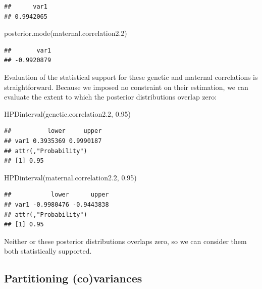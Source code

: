 \documentclass[
  12pt,
]{book}
\newenvironment{Shaded}{\begin{snugshade}}{\end{snugshade}}
\newcommand{\FloatTok}[1]{\textcolor[rgb]{0.00,0.00,0.81}{#1}}
\newcommand{\FunctionTok}[1]{\textcolor[rgb]{0.00,0.00,0.00}{#1}}
\newcommand{\NormalTok}[1]{#1}
\begin{document}
\begin{verbatim}
##      var1 
## 0.9942065
\end{verbatim}

\begin{Shaded}
\begin{Highlighting}[]
\FunctionTok{posterior.mode}\NormalTok{(maternal.correlation2}\FloatTok{.2}\NormalTok{)}
\end{Highlighting}
\end{Shaded}

\begin{verbatim}
##       var1 
## -0.9920879
\end{verbatim}

Evaluation of the statistical support for these genetic and maternal correlations is straightforward. Because we imposed no constraint on their estimation, we can evaluate the extent to which the posterior distributions overlap zero:

\begin{Shaded}
\begin{Highlighting}[]
\FunctionTok{HPDinterval}\NormalTok{(genetic.correlation2}\FloatTok{.2}\NormalTok{, }\FloatTok{0.95}\NormalTok{)}
\end{Highlighting}
\end{Shaded}

\begin{verbatim}
##          lower     upper
## var1 0.3935369 0.9990187
## attr(,"Probability")
## [1] 0.95
\end{verbatim}

\begin{Shaded}
\begin{Highlighting}[]
\FunctionTok{HPDinterval}\NormalTok{(maternal.correlation2}\FloatTok{.2}\NormalTok{, }\FloatTok{0.95}\NormalTok{)}
\end{Highlighting}
\end{Shaded}

\begin{verbatim}
##           lower      upper
## var1 -0.9980476 -0.9443838
## attr(,"Probability")
## [1] 0.95
\end{verbatim}

Neither or these posterior distributions overlaps zero, so we can consider them both statistically supported.

\hypertarget{partitioning-covariances}{%
\subsection{Partitioning (co)variances}\label{partitioning-covariances}}
\end{document}
